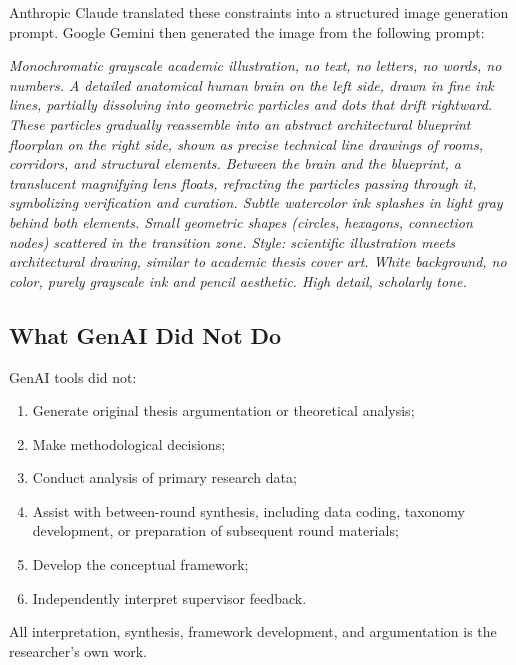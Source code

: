 Anthropic Claude translated these constraints into a structured image generation
prompt. Google Gemini then generated the image from the following prompt:

\textit{Monochromatic grayscale academic illustration, no text, no letters, no
words, no numbers. A detailed anatomical human brain on the left side, drawn in
fine ink lines, partially dissolving into geometric particles and dots that drift
rightward. These particles gradually reassemble into an abstract architectural
blueprint floorplan on the right side, shown as precise technical line drawings
of rooms, corridors, and structural elements. Between the brain and the
blueprint, a translucent magnifying lens floats, refracting the particles
passing through it, symbolizing verification and curation. Subtle watercolor ink
splashes in light gray behind both elements. Small geometric shapes (circles,
hexagons, connection nodes) scattered in the transition zone. Style: scientific
illustration meets architectural drawing, similar to academic thesis cover art.
White background, no color, purely grayscale ink and pencil aesthetic. High
detail, scholarly tone.}

\subsection{What GenAI Did Not Do}

GenAI tools did not:

\begin{enumerate}
    \item Generate original thesis argumentation or theoretical analysis;
    \item Make methodological decisions;
    \item Conduct analysis of primary research data;
    \item Assist with between-round synthesis, including data coding, taxonomy
          development, or preparation of subsequent round materials;
    \item Develop the conceptual framework;
    \item Independently interpret supervisor feedback.
\end{enumerate}

All interpretation, synthesis, framework development, and argumentation is
the researcher's own work.
